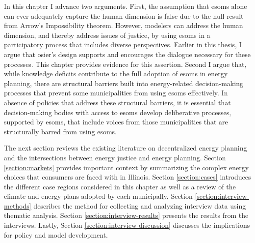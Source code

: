 In this chapter I advance two arguments. First, the assumption that \acp{esom}
alone can ever adequately capture the human dimension is false due to the null
result from Arrow's Impossibility theorem. However, modelers can address the
human dimension, and thereby address issues of justice, by using \acp{esom} in a
participatory process that includes diverse perspectives. Earlier in this
thesis, I argue that \ac{osier}'s design supports and encourages the dialogue
necessary for these processes. This chapter provides evidence for this
assertion. Second I argue that, while knowledge deficits contribute to the full
adoption of \acp{esom} in energy planning, there are structural barriers built
into energy-related decision-making processes that prevent some municipalities
from using \acp{esom} effectively. In absence of policies that address these
structural barriers, it is essential that decision-making bodies with access to
\acp{esom} develop deliberative processes, supported by \acp{esom}, that include
voices from those municipalities that are structurally barred from using
\acp{esom}.

The next section reviews the existing literature on decentralized energy
planning and the intersections between energy justice and energy planning.
Section \ref{section:markets} provides important context by summarizing the
complex energy choices that consumers are faced with in Illinois. Section
\ref{section:cases} introduces the different case regions considered in this
chapter as well as a review of the climate and energy plans adopted by each
municipally. Section \ref{section:interview-methods} describes the method for
collecting and analyzing interview data using thematic analysis. Section
\ref{section:interview-results} presents the results from the interviews.
Lastly, Section \ref{section:interview-discussion} discusses the implications
for policy and model development.


